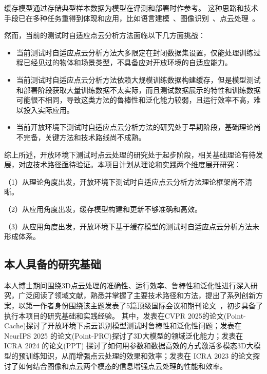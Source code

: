 \documentclass[12pt]{article}
\begin{document}
缓存模型通过存储典型样本数据为模型在评测和部署时作参考。
这种思路和技术手段已在多种任务重得到体现和应用，比如语言建模~\cite{vinyals16mn,grave17unbounded,merity17pointer,khandelwal20generalization}、图像识别~\cite{vinyals16mn,snell17prototypical,finn17maml,chen18a,chen21meta-baseline,choi22improving,iwasawa21t3a,zhang22tip-adapter,zhang23cafo,karmanov24tda}、点云处理~\cite{zhang23pointnn,tang24pointpeft,sun25pointcache,wang24bftt3d,tamjidi2025uniadapter}。

然而，当前的测试时自适应点云分析方法面临以下几方面挑战：
\begin{itemize}
    \item 当前测试时自适应点云分析方法大多限定在封闭数据集设置，仅能处理训练过程已经见过的物体和场景类型，不具备应对开放环境的自适应能力。
    \item 当前测试时自适应点云分析方法依赖大规模训练数据构建缓存，但是模型测试和部署阶段获取大量训练数据不太实际，而且测试数据展示的特性和训练数据可能很不相同，导致这类方法的鲁棒性和泛化能力较弱，且运行效率不高，难以投入实际应用。
    \item 当前开放环境下测试时自适应点云分析方法的研究处于早期阶段，基础理论尚不完备，关键方法和技术路线尚不成熟。
\end{itemize}

综上所述，开放环境下测试时点云处理的研究处于起步阶段，相关基础理论有待发展，对应技术路径亟待验证。本项目计划从理论和实践两个维度展开研究：

（1）从理论角度出发，开放环境下测试时自适应点云分析方法理论框架尚不清晰。

（2）从应用角度出发，缓存模型构建和更新不够准确和高效。

（3）从应用角度出发，开放环境下基于缓存模型的测试时自适应点云分析方法未形成体系。

\subsection{本人具备的研究基础}

本人博士期间围绕3D点云处理的准确性、运行效率、鲁棒性和泛化性进行深入研究，广泛阅读了领域文献，熟悉并掌握了主要技术路径和方法，提出了系列创新方案，以第一作者身份围绕该主题发表了5篇顶级国际会议和期刊论文~\cite{sun25pointcache,sun24point-prc,sun25vsformer,sun24ppt3d,sun23vipformer}，初步具备了执行本项目的研究基础和实践经验。
其中，发表在CVPR 2025的论文(Point-Cache)探讨了开放环境下点云识别模型测试时鲁棒性和泛化性问题；发表在 NeurIPS 2025 的论文(Point-PRC)探讨了3D大模型的领域泛化能力；发表在 ICRA 2024 的论文(PPT) 探讨了如何用参数和数据高效的方式激活多模态3D大模型的预训练知识，从而增强点云处理的效果和效率；发表在 ICRA 2023 的论文探讨了如何结合图像和点云两个模态的信息增强点云处理的性能和效率。
\end{document}
